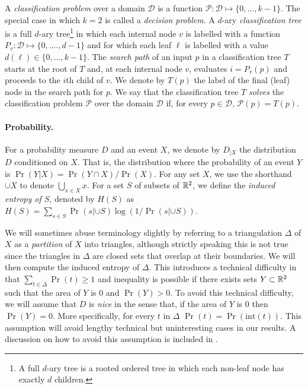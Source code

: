\documentclass[lotsofwhite]{patmorin}
\newcommand{\interior}{\mathrm{int}}
\begin{document}
A \emph{classification problem} over a domain $\mathcal{D}$ is a
function $\mathcal{P}:\mathcal{D}\mapsto \{0,\ldots,k-1\}$.  The
special case in which $k=2$ is called a \emph{decision problem}.  A
$d$-ary \emph{classification tree} is a full $d$-ary tree\footnote{A
full $d$-ary tree is a rooted ordered tree in which each non-leaf node
has exactly $d$ children.} in which each internal node $v$ is labelled
with a function $P_v:\mathcal{D}\mapsto\{0,.\ldots,d-1\}$ and for
which each leaf $\ell$ is labelled with a value
$d(\ell)\in\{0,\ldots,k-1\}$. The \emph{search path} of an input $p$
in a classification tree $T$ starts at the root of $T$ and, at each
internal node $v$, evaluates $i=P_v(p)$ and proceeds to the $i$th
child of $v$.  We denote by $T(p)$ the label of the final (leaf) node
in the search path for $p$.  We say that the classification tree $T$
\emph{solves} the classification problem $\mathcal{P}$ over the domain
$\mathcal{D}$ if, for every $p\in \mathcal{D}$, $\mathcal{P}(p)=T(p)$.

\paragraph{Probability.}

For a probability measure $D$ and an event $X$, we denote by $D_{|X}$ the
distribution $D$ conditioned on $X$.  That is, the distribution where
the probability of an event $Y$ is $\Pr(Y|X)=\Pr(Y\cap X)/\Pr(X)$.
For any set $X$, we use the shorthand $\cup X$ to denote
$\bigcup_{x\in X} x$.  For a set $S$ of subsets of $\mathbb{R}^2$, we define
the \emph{induced entropy of $S$}, denoted by $H(S)$ as
$H(S)=\sum_{s\in S}\Pr(s|{\cup S})\log(1/\Pr(s|{\cup S}))$.

We will sometimes abuse terminology slightly by referring to a
triangulation $\Delta$ of $X$ as a \emph{partition} of $X$ into
triangles, although strictly speaking this is not true since the
triangles in $\Delta$ are closed sets that overlap at their
boundaries.  We will then compute the induced entropy of $\Delta$.
This introduces a technical difficulty in that
$\sum_{t\in\Delta}\Pr(t)\ge 1$ and inequality is possible if there
exists sets $Y\subset \mathbb{R}^2$ such that the area of $Y$ is 0 and
$\Pr(Y)>0$.  To avoid this technical difficulty, we will assume that
$D$ is \emph{nice} in the sense that, if the area of $Y$ is 0 then
$\Pr(Y)=0$.   More specifically, for every $t$ in $\Delta$ $\Pr(t) =
\Pr(\interior(t))$.  This assumption will avoid lengthy technical but
uninteresting cases in our results.  A discussion on how to avoid this
assumption is included in .
\end{document}
